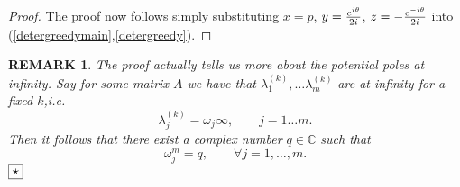 \documentclass[10pt,a4paper,reqno]{amsart}
\newtheorem{rem}[defi]{\bf R\scriptsize EMARK \normalsize}
\def\kopr{\hfill\raisebox{3pt}{\framebox{$\star$}}}
\newenvironment{remark}{\begin{rem}\rm}{$\kopr$\end{rem}}
\newcommand{\zav}[1]{\left( #1 \right)}
\newcommand{\imag}{{\rm i}}
\newcommand{\deter}[1]{\det\zav{#1}}
\newcommand{\tr}{{\rm tr}\,}
\newcommand{\trunc}[1]{\left\lfloor #1 \right\rfloor}
\begin{document}
\begin{proof}
The proof now follows simply substituting $x=p$, $ y=\frac{e^{\imag \theta}}{2\imag}$, $z=-\frac{e^{-\imag \theta}}{2\imag}$ into (\ref{detergreedymain},\ref{detergreedy}).

%
\end{proof}
\begin{remark}
The proof actually tells us more about the potential poles at infinity.
Say for some matrix $A$ we have that
$
\lambda_1^{(k)},\dots\lambda_m^{(k)} 
$
are at infinity for a fixed $k$,i.e.
$$
\lambda_j^{(k)}=\omega_j\infty,\qquad j=1\dots m.
$$
Then it follows that there exist a complex number $q\in\mathbb{C}$ such that
$$
\omega_j^m=q,\qquad \forall j=1,\dots,m.
$$
\end{remark}
\end{document}
